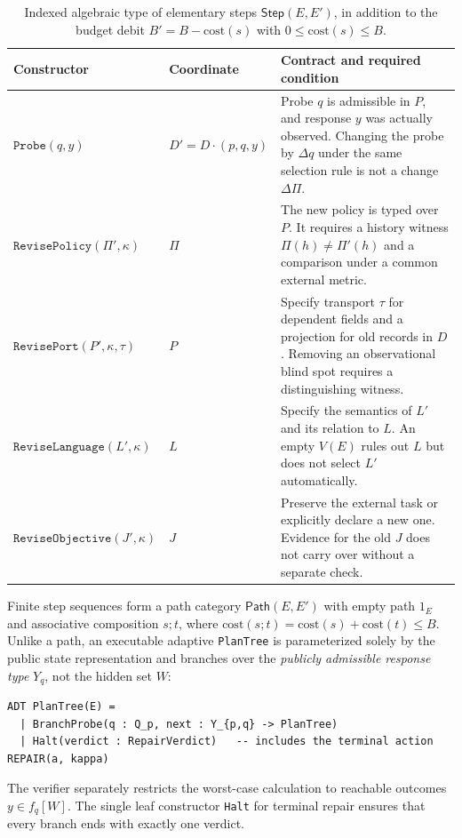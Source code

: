 \documentclass[11pt,a4paper]{article}
\theoremstyle{preprintthm}
\theoremstyle{preprintdef}
\begin{document}
\begin{table}[!htbp]
\centering
\caption{Indexed algebraic type of elementary steps $\mathsf{Step}(E,E')$, in addition to the budget debit $B'=B-\mathrm{cost}(s)$ with $0\le\mathrm{cost}(s)\le B$.}
\label{tab:steps}
\footnotesize
\begin{tabularx}{\linewidth}{@{}l l >{\raggedright\arraybackslash}X@{}}
\toprule
\textbf{Constructor} & \textbf{Coordinate} & \textbf{Contract and required condition} \\
\midrule
$\texttt{Probe}(q,y)$ & $D'\!=\!D\cdot(p,q,y)$ & Probe $q$ is admissible in $P$, and response $y$ was actually observed. Changing the probe by $\Delta q$ under the same selection rule is not a change $\Delta\Pi$. \\
$\texttt{RevisePolicy}(\Pi',\kappa)$ & $\Pi$ & The new policy is typed over $P$. It requires a history witness $\Pi(h)\ne\Pi'(h)$ and a comparison under a common external metric. \\
$\texttt{RevisePort}(P',\kappa,\tau)$ & $P$ & Specify transport $\tau$ for dependent fields and a projection for old records in $D$. Removing an observational blind spot requires a distinguishing witness. \\
$\texttt{ReviseLanguage}(L',\kappa)$ & $L$ & Specify the semantics of $L'$ and its relation to $L$. An empty $V(E)$ rules out $L$ but does not select $L'$ automatically. \\
$\texttt{ReviseObjective}(J',\kappa)$ & $J$ & Preserve the external task or explicitly declare a new one. Evidence for the old $J$ does not carry over without a separate check. \\
\bottomrule
\end{tabularx}
\end{table}

Finite step sequences form a path category $\mathsf{Path}(E,E')$ with empty path $1_E$ and associative composition $s;t$, where $\mathrm{cost}(s;t)=\mathrm{cost}(s)+\mathrm{cost}(t)\le B$. Unlike a path, an executable adaptive \texttt{PlanTree} is parameterized solely by the public state representation and branches over the \emph{publicly admissible response type} $Y_q$, not the hidden set $W$:
\begin{lstlisting}[caption={Safe contract for an adaptive plan tree without leaking the hidden world set $W$.}]
ADT PlanTree(E) =
  | BranchProbe(q : Q_p, next : Y_{p,q} -> PlanTree)
  | Halt(verdict : RepairVerdict)   -- includes the terminal action REPAIR(a, kappa)
\end{lstlisting}
The verifier separately restricts the worst-case calculation to reachable outcomes $y\in f_q[W]$. The single leaf constructor \texttt{Halt} for terminal repair ensures that every branch ends with exactly one verdict.
\end{document}
